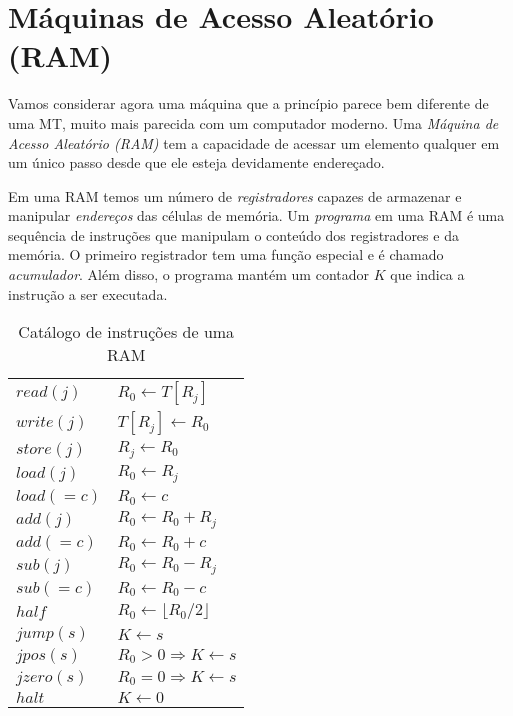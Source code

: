 \section{Máquinas de Acesso Aleatório (RAM)}
\label{sec:ram}

Vamos considerar agora uma máquina que a princípio parece bem diferente de uma MT, muito mais parecida com um computador moderno.
Uma {\em Máquina de Acesso Aleatório (RAM)} tem a capacidade de acessar um elemento qualquer em um único passo desde que ele esteja devidamente endereçado.

Em uma RAM temos um número de {\em registradores} capazes de armazenar e manipular {\em endereços} das células de memória.
Um {\em programa} em uma RAM é uma sequência de instruções que manipulam o conteúdo dos registradores e da memória.
O primeiro registrador tem uma função especial e é chamado {\em acumulador}.
Além disso, o programa mantém um contador $K$ que indica a instrução a ser executada.

\begin{center}
\end{center}

\begin{table}
  \label{tab:instrucoes}
  \centering
  \begin{tabular}{|ll|}
    \hline
    $read(j)$ & $R_0 \leftarrow T[R_j]$\\
    $write(j)$ & $T[R_j] \leftarrow R_0$\\
    $store(j)$ & $R_j \leftarrow R_0$\\
    $load(j)$ & $R_0 \leftarrow R_j$\\
    $load(=c)$ & $R_0 \leftarrow c$\\
    $add(j)$ & $R_0 \leftarrow R_0 + R_j$\\
    $add(=c)$ & $R_0 \leftarrow R_0 + c$\\
    $sub(j)$ & $R_0 \leftarrow R_0 - R_j$\\
    $sub(=c)$ & $R_0 \leftarrow R_0 - c$\\
    $half$ & $R_0 \leftarrow \lfloor R_0/2 \rfloor$\\
    $jump(s)$ & $K \leftarrow s$\\
    $jpos(s)$ & $R_0 > 0 \Rightarrow K \leftarrow s$\\
    $jzero(s)$ & $R_0 = 0 \Rightarrow K \leftarrow s$\\
    $halt$ & $K \leftarrow 0$\\
    \hline
  \end{tabular}
  \caption{Catálogo de instruções de uma RAM}
\end{table}

